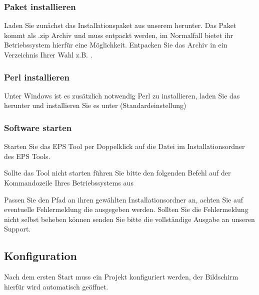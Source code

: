 \documentclass[letterpaper,10pt,ngerman]{sphinxmanual}
\begin{document}
\subsubsection{Paket installieren}
\label{\detokenize{tools/epstool:paket-installieren}}
Laden Sie zunächst das Installationspaket aus unserem  herunter.
Das Paket kommt als .zip Archiv und muss entpackt werden, im Normalfall bietet ihr Betriebssystem hierfür eine Möglichkeit.
Entpacken Sie das Archiv in ein Verzeichnis Ihrer Wahl z.B. . 


\subsubsection{Perl installieren}
\label{\detokenize{tools/epstool:perl-installieren}}
Unter Windows ist es zusätzlich notwendig Perl zu installieren, laden Sie das  herunter
und installieren Sie es unter  (Standardeinstellung)


\subsubsection{Software starten}
\label{\detokenize{tools/epstool:software-starten}}
Starten Sie das EPS Tool per Doppelklick auf die Datei  im Installationsordner des EPS Tools.

Sollte das Tool nicht starten führen Sie bitte den folgenden Befehl auf der Kommandozeile Ihres Betriebssystems aus


Passen Sie den Pfad an ihren gewählten Installationsordner an, achten Sie auf eventuelle Fehlermeldung die ausgegeben
werden. Sollten Sie die Fehlermeldung nicht selbst beheben können senden Sie bitte die vollständige Ausgabe an unseren Support.


\subsection{Konfiguration}
\label{\detokenize{tools/epstool:konfiguration}}
Nach dem ersten Start muss ein Projekt konfiguriert werden, der Bildschirm hierfür wird automatisch geöffnet.
\end{document}
